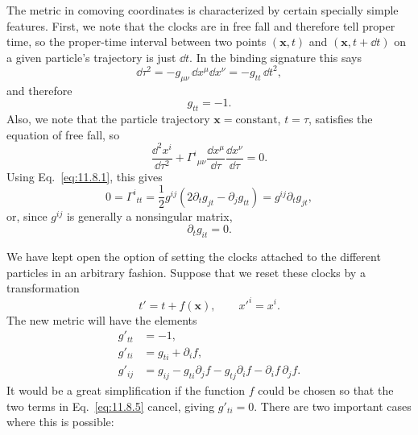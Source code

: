 The metric in comoving coordinates is characterized by certain specially
simple features. First, we note that the clocks are in free fall and therefore
tell proper time, so the proper-time interval between two points
\((\mathbf{x},t)\) and \((\mathbf{x},t+\dd t)\) on a given particle's trajectory
is just \(\dd t\). In the binding signature this says
\[
  \dd\tau^2=-g_{\mu\nu}\,\dd x^\mu \dd x^\nu=-g_{tt}\,\dd t^2,
\]
and therefore
\begin{equation}
  g_{tt}=-1.
  \tag{11.8.1}\label{eq:11.8.1}
\end{equation}
Also, we note that the particle trajectory
\(\mathbf{x}=\text{constant}\), \(t=\tau\), satisfies the equation of free
fall, so
\[
  \frac{\dd^2x^i}{\dd\tau^2}
  +\Gamma^i{}_{\mu\nu}
   \frac{\dd x^\mu}{\dd\tau}\frac{\dd x^\nu}{\dd\tau}
  =0.
\]
Using Eq.~\eqref{eq:11.8.1}, this gives
\[
  0=\Gamma^i{}_{tt}
  =\frac12 g^{ij}
   \left(2\partial_tg_{jt}-\partial_jg_{tt}\right)
  =g^{ij}\partial_tg_{jt},
\]
or, since \(g^{ij}\) is generally a nonsingular matrix,
\begin{equation}
  \partial_tg_{it}=0.
  \tag{11.8.2}\label{eq:11.8.2}
\end{equation}

We have kept open the option of setting the clocks attached to the different
particles in an arbitrary fashion. Suppose that we reset these clocks by a
transformation
\begin{equation}
  t'=t+f(\mathbf{x}),\qquad x'^i=x^i.
  \tag{11.8.3}\label{eq:11.8.3}
\end{equation}
The new metric will have the elements
\begin{align}
  g'_{tt}&=-1,
  \tag{11.8.4}\label{eq:11.8.4}\\
  g'_{ti}&=g_{ti}+\partial_i f,
  \tag{11.8.5}\label{eq:11.8.5}\\
  g'_{ij}
  &=g_{ij}
    -g_{ti}\partial_jf-g_{tj}\partial_if
    -\partial_if\,\partial_jf.
  \tag{11.8.6}\label{eq:11.8.6}
\end{align}
It would be a great simplification if the function \(f\) could be chosen so
that the two terms in Eq.~\eqref{eq:11.8.5} cancel, giving \(g'_{ti}=0\).
There are two important cases where this is possible:

